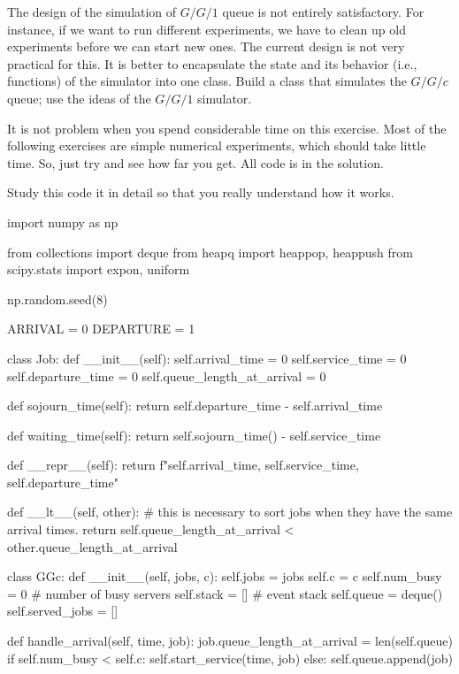 \begin{exercise}
  The design of the simulation of $G/G/1$ queue is not entirely satisfactory. For instance, if we want to run different experiments, we have to clean up old experiments before we can start new ones. The current design is not very practical for this. It is better to encapsulate the state and its behavior (i.e., functions) of the simulator into one class. Build a class that simulates the $G/G/c$ queue; use the ideas of the $G/G/1$ simulator.

It is not  problem when you spend considerable time on this exercise. Most of the following exercises are simple numerical experiments, which should take little time. So, just try and see how far you get. All code is in the solution.

\begin{solution}
  Study this code it in detail so that you really understand how it works.

\begin{pyverbatim}
import numpy as np

from collections import deque
from heapq import heappop, heappush
from scipy.stats import expon, uniform

np.random.seed(8)

ARRIVAL = 0
DEPARTURE = 1


class Job:
    def __init__(self):
        self.arrival_time = 0
        self.service_time = 0
        self.departure_time = 0
        self.queue_length_at_arrival = 0

    def sojourn_time(self):
        return self.departure_time - self.arrival_time

    def waiting_time(self):
        return self.sojourn_time() - self.service_time

    def __repr__(self):
        return f"{self.arrival_time}, {self.service_time}, {self.departure_time}\n"

    def __lt__(self, other):
        # this is necessary to sort jobs when they have the same arrival times.
        return self.queue_length_at_arrival < other.queue_length_at_arrival


class GGc:
    def __init__(self, jobs, c):
        self.jobs = jobs
        self.c = c
        self.num_busy = 0  # number of busy servers
        self.stack = []  # event stack
        self.queue = deque()
        self.served_jobs = []

    def handle_arrival(self, time, job):
        job.queue_length_at_arrival = len(self.queue)
        if self.num_busy < self.c:
            self.start_service(time, job)
        else:
            self.queue.append(job)


\end{pyverbatim}
\end{solution}
\end{exercise}
